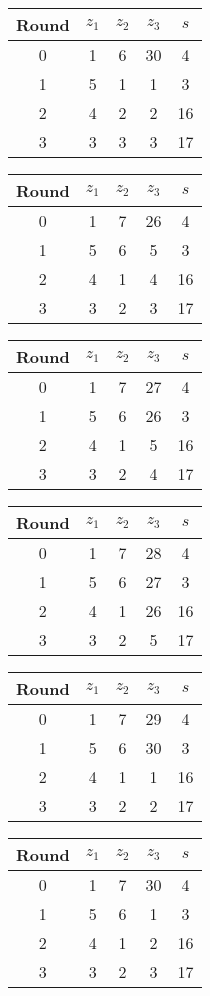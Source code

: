 \begin{tabular}{c | c | c | c | c }
Round & $z_1$ & $z_2$ & $z_3$ & $s$ \\
\hline
0 & 1 & 6 & 30 & 4 \\
1 & 5 & 1 & 1 & 3 \\
2 & 4 & 2 & 2 & 16 \\
3 & 3 & 3 & 3 & 17
\end{tabular}

\begin{tabular}{c | c | c | c | c }
Round & $z_1$ & $z_2$ & $z_3$ & $s$ \\
\hline
0 & 1 & 7 & 26 & 4 \\
1 & 5 & 6 & 5 & 3 \\
2 & 4 & 1 & 4 & 16 \\
3 & 3 & 2 & 3 & 17
\end{tabular}

\begin{tabular}{c | c | c | c | c }
Round & $z_1$ & $z_2$ & $z_3$ & $s$ \\
\hline
0 & 1 & 7 & 27 & 4 \\
1 & 5 & 6 & 26 & 3 \\
2 & 4 & 1 & 5 & 16 \\
3 & 3 & 2 & 4 & 17
\end{tabular}

\begin{tabular}{c | c | c | c | c }
Round & $z_1$ & $z_2$ & $z_3$ & $s$ \\
\hline
0 & 1 & 7 & 28 & 4 \\
1 & 5 & 6 & 27 & 3 \\
2 & 4 & 1 & 26 & 16 \\
3 & 3 & 2 & 5 & 17
\end{tabular}

\begin{tabular}{c | c | c | c | c }
Round & $z_1$ & $z_2$ & $z_3$ & $s$ \\
\hline
0 & 1 & 7 & 29 & 4 \\
1 & 5 & 6 & 30 & 3 \\
2 & 4 & 1 & 1 & 16 \\
3 & 3 & 2 & 2 & 17
\end{tabular}

\begin{tabular}{c | c | c | c | c }
Round & $z_1$ & $z_2$ & $z_3$ & $s$ \\
\hline
0 & 1 & 7 & 30 & 4 \\
1 & 5 & 6 & 1 & 3 \\
2 & 4 & 1 & 2 & 16 \\
3 & 3 & 2 & 3 & 17
\end{tabular}

